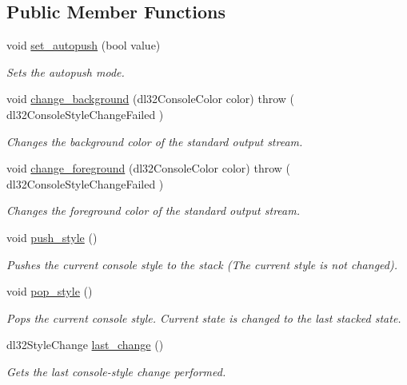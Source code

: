\subsection*{Public Member Functions}
\begin{DoxyCompactItemize}
\item 
void \hyperlink{classdl32_console_color_settings_acbab4004a3265c9da413588eb458230e}{set\-\_\-autopush} (bool value)
\begin{DoxyCompactList}\small\item\em Sets the autopush mode. \end{DoxyCompactList}\item 
void \hyperlink{classdl32_console_color_settings_ae3b3878b4e42fe3ba3c4064be2321226}{change\-\_\-background} (dl32\-Console\-Color color)  throw ( dl32\-Console\-Style\-Change\-Failed )
\begin{DoxyCompactList}\small\item\em Changes the background color of the standard output stream. \end{DoxyCompactList}\item 
void \hyperlink{classdl32_console_color_settings_a1e21ddc919771c3304d6840cf33b52a5}{change\-\_\-foreground} (dl32\-Console\-Color color)  throw ( dl32\-Console\-Style\-Change\-Failed )
\begin{DoxyCompactList}\small\item\em Changes the foreground color of the standard output stream. \end{DoxyCompactList}\item 
void \hyperlink{classdl32_console_color_settings_a197fd95f9f490722b427b3b082c9260a}{push\-\_\-style} ()
\begin{DoxyCompactList}\small\item\em Pushes the current console style to the stack (The current style is not changed). \end{DoxyCompactList}\item 
void \hyperlink{classdl32_console_color_settings_a823ccee6028e27d3de0f9010602c1633}{pop\-\_\-style} ()
\begin{DoxyCompactList}\small\item\em Pops the current console style. Current state is changed to the last stacked state. \end{DoxyCompactList}\item 
dl32\-Style\-Change \hyperlink{classdl32_console_color_settings_ae9ab48d003523415bfe24f0ef2ab7c88}{last\-\_\-change} ()
\begin{DoxyCompactList}\small\item\em Gets the last console-\/style change performed. \end{DoxyCompactList}\item 

\end{DoxyCompactItemize}
